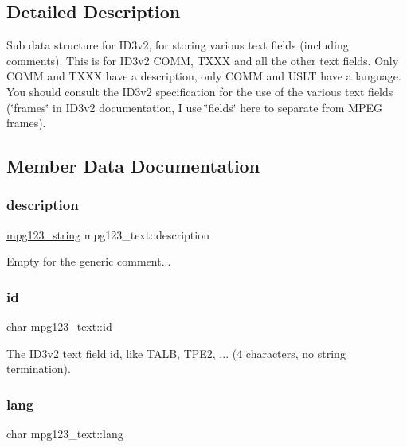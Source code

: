 \subsection{Detailed Description}
Sub data structure for I\+D3v2, for storing various text fields (including comments). This is for I\+D3v2 C\+O\+MM, T\+X\+XX and all the other text fields. Only C\+O\+MM and T\+X\+XX have a description, only C\+O\+MM and U\+S\+LT have a language. You should consult the I\+D3v2 specification for the use of the various text fields (\char`\"{}frames\char`\"{} in I\+D3v2 documentation, I use \char`\"{}fields\char`\"{} here to separate from M\+P\+EG frames). 

\subsection{Member Data Documentation}
\mbox{\label{structmpg123__text_afc19e602b7a696d8a0ed03ae6b86f1bf}} 
\subsubsection{\texorpdfstring{description}{description}}
{\footnotesize\ttfamily \hyperlink{structmpg123__string}{mpg123\+\_\+string} mpg123\+\_\+text\+::description}

Empty for the generic comment... \mbox{\label{structmpg123__text_a6692f67747f8d8e782d3beffce51ee36}} 
\subsubsection{\texorpdfstring{id}{id}}
{\footnotesize\ttfamily char mpg123\+\_\+text\+::id}

The I\+D3v2 text field id, like T\+A\+LB, T\+P\+E2, ... (4 characters, no string termination). \mbox{\label{structmpg123__text_aa8c57dde0eeb08c24727391bfc8e69d3}} 
\subsubsection{\texorpdfstring{lang}{lang}}
{\footnotesize\ttfamily char mpg123\+\_\+text\+::lang}

